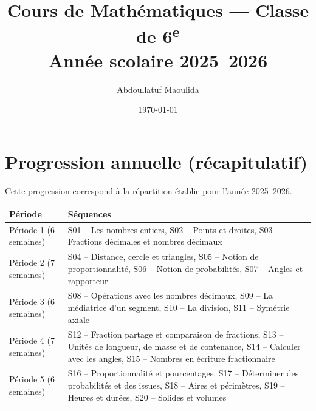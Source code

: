 \documentclass[12pt,a4paper]{book}
\title{Cours de Mathématiques — Classe de 6\textsuperscript{e}\\[0.4em]\large Année scolaire 2025–2026}
\author{Abdoullatuf Maoulida}
\date{\today}
\newcommand{\InputSeq}[2]{%
	\setcounter{chapter}{\numexpr#1-1\relax}%
}
\begin{document}
\maketitle
\tableofcontents
\cleardoublepage

\InputSeq{6}{chapitres/seq_06_proportionnalite_partie_1}

\cleardoublepage
\appendix
\chapter{Progression annuelle (récapitulatif)}
Cette progression correspond à la répartition établie pour l'année 2025–2026.

\begin{center}
\renewcommand{\arraystretch}{1.2}
\begin{tabularx}{\textwidth}{|>{\raggedright\arraybackslash}p{}|>{\raggedright\arraybackslash}X|}
\hline
\textbf{Période} & \textbf{Séquences}\\ \hline
Période 1 (6 semaines) & S01 -- Les nombres entiers, S02 -- Points et droites, S03 -- Fractions décimales et nombres décimaux\\ \hline
Période 2 (7 semaines) & S04 -- Distance, cercle et triangles, S05 -- Notion de proportionnalité, S06 -- Notion de probabilités, S07 -- Angles et rapporteur\\ \hline
Période 3 (6 semaines) & S08 -- Opérations avec les nombres décimaux, S09 -- La médiatrice d'un segment, S10 -- La division, S11 -- Symétrie axiale\\ \hline
Période 4 (7 semaines) & S12 -- Fraction partage et comparaison de fractions, S13 -- Unités de longueur, de masse et de contenance, S14 -- Calculer avec les angles, S15 -- Nombres en écriture fractionnaire\\ \hline
Période 5 (6 semaines) & S16 -- Proportionnalité et pourcentages, S17 -- Déterminer des probabilités et des issues, S18 -- Aires et périmètres, S19 -- Heures et durées, S20 -- Solides et volumes\\ \hline
\end{tabularx}
\end{center}
\end{document}
